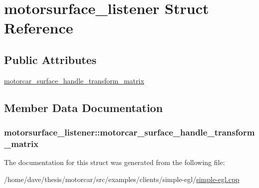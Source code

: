 \hypertarget{structmotorsurface__listener}{\section{motorsurface\-\_\-listener Struct Reference}
\label{structmotorsurface__listener}
}
\subsection*{Public Attributes}
\begin{DoxyCompactItemize}
\item 
\hyperlink{structmotorsurface__listener_a4d4b3119171f1602c0882696545a8921}{motorcar\-\_\-surface\-\_\-handle\-\_\-transform\-\_\-matrix}
\end{DoxyCompactItemize}


\subsection{Member Data Documentation}
\hypertarget{structmotorsurface__listener_a4d4b3119171f1602c0882696545a8921}{
\subsubsection[{motorcar\-\_\-surface\-\_\-handle\-\_\-transform\-\_\-matrix}]{\setlength{\rightskip}{0pt plus 5cm}motorsurface\-\_\-listener\-::motorcar\-\_\-surface\-\_\-handle\-\_\-transform\-\_\-matrix}}\label{structmotorsurface__listener_a4d4b3119171f1602c0882696545a8921}


The documentation for this struct was generated from the following file\-:\begin{DoxyCompactItemize}
\item 
/home/dave/thesis/motorcar/src/examples/clients/simple-\/egl/\hyperlink{simple-egl_8cpp}{simple-\/egl.\-cpp}\end{DoxyCompactItemize}
